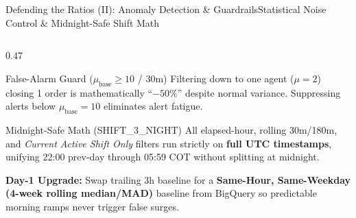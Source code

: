\documentclass[aspectratio=169,8pt]{beamer}
\newcommand{\code}[1]{{\fontfamily{pcr}\selectfont\fontsize{6.5}{8.0}\selectfont\color{ink}#1}}
\begin{document}
\begin{frame}[t]{Defending the Ratios (II): Anomaly Detection \& Guardrails}{Statistical Noise Control \& Midnight-Safe Shift Math}
\begin{columns}[T,onlytextwidth]
  \begin{column}{0.47\textwidth}
    \begin{neutralcard}[top=3pt,bottom=3pt]{False-Alarm Guard ($\mu_{\text{base}} \geq 10$ / 30m)}
      {\fontsize{6.2}{7.7}\selectfont Filtering down to one agent ($\mu=2$) closing 1 order is mathematically ``$-50\%$'' despite normal variance. Suppressing alerts below $\mu_{\text{base}}=10$ eliminates alert fatigue.}
    \end{neutralcard}
    \vspace{2.5pt}
    \begin{neutralcard}[top=3pt,bottom=3pt]{Midnight-Safe Math (\code{SHIFT\_3\_NIGHT})}
      {\fontsize{6.2}{7.7}\selectfont All elapsed-hour, rolling 30m/180m, and \textit{Current Active Shift Only} filters run strictly on \textbf{full UTC timestamps}, unifying \code{22:00} prev-day through \code{05:59 COT} without splitting at midnight.}
    \end{neutralcard}
    \vspace{2.5pt}
    \begin{calloutbar}[ink]
      {\fontsize{6.1}{7.6}\selectfont \textbf{Day-1 Upgrade:} Swap trailing 3h baseline for a \textbf{Same-Hour, Same-Weekday (4-week rolling median/MAD)} baseline from BigQuery so predictable morning ramps never trigger false surges.}
    \end{calloutbar}
  \end{column}
\end{columns}
\end{frame}
\end{document}
